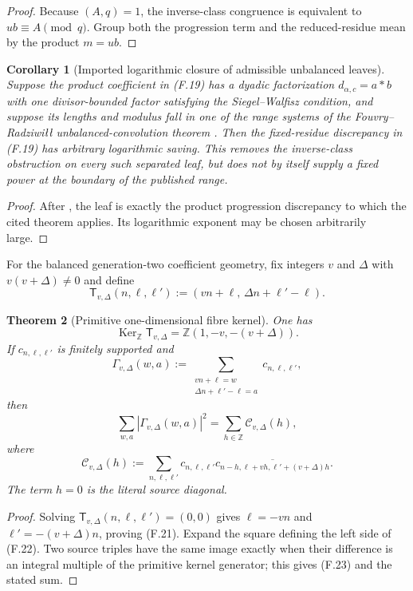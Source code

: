 \documentclass[11pt]{article}
\newtheorem{theorem}{Theorem}[section]
\newtheorem{corollary}[theorem]{Corollary}
\theoremstyle{definition}
\theoremstyle{remark}
\newcommand{\Z}{\mathbb Z}
\newcommand{\Ker}{\operatorname{Ker}}
\begin{document}
\begin{proof}
Because $(A,q)=1$, the inverse-class congruence is equivalent to
$ub\equiv A\pmod q$.  Group both the progression term and the reduced-residue
mean by the product $m=ub$.
\end{proof}

\begin{corollary}[Imported logarithmic closure of admissible unbalanced leaves]
\label{cor:freq-FR-leaf}
Suppose the product coefficient in \textup{(F.19)} has a dyadic
factorization $d_{\alpha,c}=a*b$ with one divisor-bounded factor satisfying
the Siegel--Walfisz condition, and suppose its lengths and modulus fall in one
of the range systems of the Fouvry--Radziwi\l\l{} unbalanced-convolution
theorem \cite{FouvryRadziwill}.  Then the fixed-residue discrepancy in
\textup{(F.19)} has arbitrary logarithmic saving.  This removes the
inverse-class obstruction on every such separated leaf, but does not by
itself supply a fixed power at the boundary of the published range.
\end{corollary}

\begin{proof}
After , the leaf is exactly the product
progression discrepancy to which the cited theorem applies.  Its logarithmic
exponent may be chosen arbitrarily large.
\end{proof}

For the balanced generation-two coefficient geometry, fix integers $v$ and
$\Delta$ with $v(v+\Delta)\ne0$ and define
\[
 \mathsf T_{v,\Delta}(n,\ell,\ell')
 :=(vn+\ell,\,\Delta n+\ell'-\ell).
 \tag{F.20}
\]

\begin{theorem}[Primitive one-dimensional fibre kernel]
\label{thm:freq-lattice-kernel}
One has
\[
 \boxed{
 \Ker_{\Z}\mathsf T_{v,\Delta}
 =\Z(1,-v,-(v+\Delta)).}
 \tag{F.21}
\]
If $c_{n,\ell,\ell'}$ is finitely supported and
\[
 \Gamma_{v,\Delta}(w,a)
 :=\sum_{\substack{vn+\ell=w\\
                    \Delta n+\ell'-\ell=a}}
 c_{n,\ell,\ell'},
\]
then
\[
 \boxed{
 \sum_{w,a}|\Gamma_{v,\Delta}(w,a)|^2
 =\sum_{h\in\Z}\mathcal C_{v,\Delta}(h),}
 \tag{F.22}
\]
where
\[
 \mathcal C_{v,\Delta}(h)
 :=\sum_{n,\ell,\ell'}
 c_{n,\ell,\ell'}
 \overline{c_{n-h,\ell+vh,\ell'+(v+\Delta)h}}.
 \tag{F.23}
\]
The term $h=0$ is the literal source diagonal.
\end{theorem}

\begin{proof}
Solving $\mathsf T_{v,\Delta}(n,\ell,\ell')=(0,0)$ gives
$\ell=-vn$ and $\ell'=-(v+\Delta)n$, proving \textup{(F.21)}.  Expand the
square defining the left side of \textup{(F.22)}.  Two source triples have the
same image exactly when their difference is an integral multiple of the
primitive kernel generator; this gives \textup{(F.23)} and the stated sum.
\end{proof}
\end{document}
